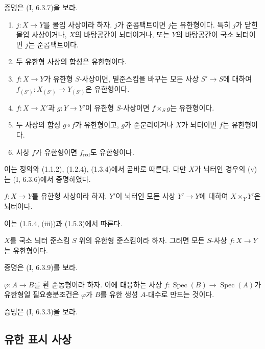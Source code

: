 증명은 (I, 6.3.7)을 보라.

\begin{proposition}[1.5.4]
\label{IV.1.5.4-fr}
\begin{enumerate}
  \item[(i)] $j:X\to Y$를 몰입 사상이라 하자. $j$가 준콤팩트이면
  $j$는 유한형이다. 특히 $j$가 닫힌 몰입 사상이거나, $X$의
  바탕공간이 뇌터이거나, 또는 $Y$의 바탕공간이 국소 뇌터이면
  $j$는 준콤팩트이다.
  \item[(ii)] 두 유한형 사상의 합성은 유한형이다.
  \item[(iii)] $f:X\to Y$가 유한형 $S$-사상이면, 밑준스킴을 바꾸는
  모든 사상 $S'\to S$에 대하여
  $f_{(S')}:X_{(S')}\to Y_{(S')}$은 유한형이다.
  \item[(iv)] $f:X\to X'$과 $g:Y\to Y'$이 유한형 $S$-사상이면
  $f\times_Sg$는 유한형이다.
  \item[(v)] 두 사상의 합성 $g\circ f$가 유한형이고, $g$가
  준분리이거나 $X$가 뇌터이면 $f$는 유한형이다.
  \item[(vi)] 사상 $f$가 유한형이면 $f_{\mathrm{red}}$도 유한형이다.
\end{enumerate}
\end{proposition}

이는 정의와 (1.1.2), (1.2.4), (1.3.4)에서 곧바로 따른다. 다만
$X$가 뇌터인 경우의 (v)는 (I, 6.3.6)에서 증명하였다.

\begin{corollary}[1.5.5]
\label{IV.1.5.5-fr}
$f:X\to Y$를 유한형 사상이라 하자. $Y'$이 뇌터인 모든 사상
$Y'\to Y$에 대하여 $X\times_YY'$은 뇌터이다.
\end{corollary}

이는 (1.5.4, (iii))과 (1.5.3)에서 따른다.

\begin{corollary}[1.5.6]
\label{IV.1.5.6-fr}
$X$를 국소 뇌터 준스킴 $S$ 위의 유한형 준스킴이라 하자. 그러면
모든 $S$-사상 $f:X\to Y$는 유한형이다.
\end{corollary}

증명은 (I, 6.3.9)를 보라.

\begin{proposition}[1.5.7]
\label{IV.1.5.7-fr}
$\varphi:A\to B$를 환 준동형이라 하자. 이에 대응하는 사상
$f:\operatorname{Spec}(B)\to\operatorname{Spec}(A)$가 유한형일
필요충분조건은 $\varphi$가 $B$를 유한 생성 $A$-대수로 만드는 것이다.
\end{proposition}

증명은 (I, 6.3.3)을 보라.

\subsection{유한 표시 사상}
\label{subsection:IV.1.6-fr}

